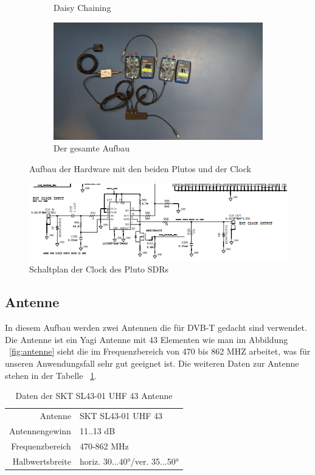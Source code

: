 \begin{figure}
\begin{subfigure}[Daisy Chaining]{0.3\textwidth}
        \caption{Daisy Chaining}
    \end{subfigure}
    \begin{subfigure}[Gesamter Aufbau]{0.3\textwidth}
        \includegraphics[width=\textwidth]{images/Pluto_4.jpeg}
        \caption{Der gesamte Aufbau}
    \end{subfigure}
    \caption{Aufbau der Hardware mit den beiden Plutos und der Clock} \label{fig:Pluto}
\end{figure}

\begin{figure}
    \centering
    \includegraphics[width=\textwidth]{images/Schaltplan_Clock.png}
    \caption{Schaltplan der Clock des Pluto SDRs} \label{fig:Clock}
\end{figure}

\subsection{Antenne}
In diesem Aufbau werden zwei Antennen die für DVB-T gedacht sind verwendet. Die Antenne ist ein Yagi Antenne mit 43 Elementen wie man im Abbildung ~\ref{fig:antenne} sieht die im Frequenzbereich von 470 bis 862 MHZ arbeitet, was für unseren Anwendungsfall sehr gut geeignet ist. Die weiteren Daten zur Antenne stehen in der Tabelle ~\ref{table:antenne}.

\begin{table}
    \centering
    \begin{tabular}[h]{rl}
        Antenne         & SKT SL43-01 UHF 43            \\
        Antennengewinn  & 11..13 dB                     \\
        Frequenzbereich & 470-862 MHz                   \\
        Halbwertsbreite & horiz. 30...40°/ver. 35...50° \\
    \end{tabular}
    \caption{Daten der SKT SL43-01 UHF 43 Antenne}\label{table:antenne}
\end{table}

